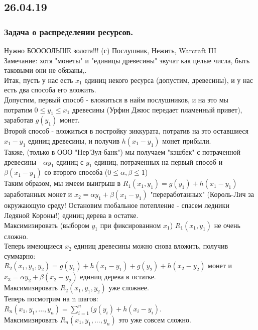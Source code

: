 \subsection{26.04.19}
\subsubsection{Задача о распределении ресурсов.}
Нужно БООООЛЬШЕ золота!!! (с) Послушник, Нежить, Warcraft III\\
Замечание: хотя "монеты" и "единицы древесины" звучат как целые числа, быть таковыми они не обязаны,.\\
Итак, пусть у нас есть $x_1$ единиц некого ресурса (допустим, древесины), и у нас есть два способа его вложить.\\
Допустим, первый способ - вложиться в найм послушников, и на это мы потратим $0 \leq y_1 \leq x_1$ древесины (Урфин Джюс передает пламенный привет), заработав $g(y_1)$ монет.\\
Второй способ - вложиться в постройку зиккурата, потратив на это оставшиеся $x_1 - y_1$ единиц древесины, и получив $h(x_1 - y_1)$ монет прибыли.\\
Также, (только в ООО "Нер'Зул-банк") мы получаем "кэшбек" с потраченной древесины - $\alpha y_1$ единиц с $y_1$ единиц, потраченных на первый способ и $\beta(x_1 - y_1)$ со второго способа ($0 \leq \alpha, \beta \leq 1$)\\
Таким образом, мы имеем выигрыш в $R_1(x_1, y_1) = g(y_1) + h(x_1 - y_1)$ заработанных монет и $x_2 = \alpha y_1 + \beta (x_1 - y_1)$ "переработанных" (Король-Лич за окружающую среду! Остановим глобальное потепление - спасем ледники Ледяной Короны!) единиц дерева в остатке.\\
Максимизировать (выбором $y_1$ при фиксированном $x_1$) $R_1(x_1, y_1)$ не очень сложно.\\
Теперь имеющиеся $x_2$ единиц древесины можно снова вложить, получив суммарно:\\
$R_2(x_1, y_1, y_2) = g(y_1) + h(x_1 - y_1) + g(y_2) + h(x_2 - y_2)$ монет и \\
$x_3 = \alpha y_2 + \beta (x_2 - y_2)$ единиц дерева в остатке.\\
Максимизировать $R_2(x_1, y_1, y_2)$ уже сложнее.\\
Теперь посмотрим на n шагов:\\
$R_n(x_1, y_1, ..., y_n) = \sum\limits_{i = 1}^n(g(y_i) + h(x_i - y_i)$.\\
Максимизировать $R_n(x_1, y_1, ..., y_n)$ это уже совсем сложно.\\
